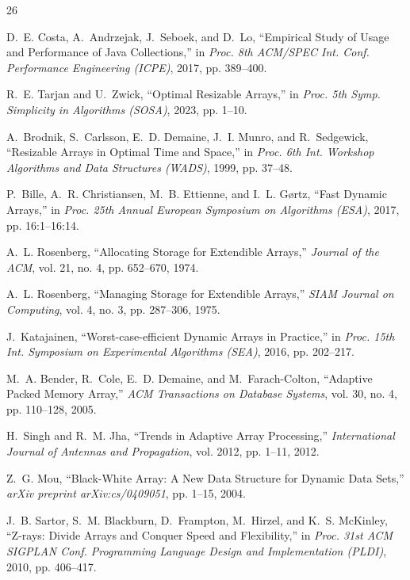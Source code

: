 \begin{thebibliography}{26}

D.~E. Costa, A.~Andrzejak, J.~Seboek, and D.~Lo, ``Empirical Study of Usage and Performance of Java Collections,'' in \emph{Proc. 8th ACM/SPEC Int. Conf. Performance Engineering (ICPE)}, 2017, pp. 389--400.

R.~E. Tarjan and U.~Zwick, ``Optimal Resizable Arrays,'' in \emph{Proc. 5th Symp. Simplicity in Algorithms (SOSA)}, 2023, pp. 1--10.

A.~Brodnik, S.~Carlsson, E.~D. Demaine, J.~I. Munro, and R.~Sedgewick, ``Resizable Arrays in Optimal Time and Space,'' in \emph{Proc. 6th Int. Workshop Algorithms and Data Structures (WADS)}, 1999, pp. 37--48.

P.~Bille, A.~R. Christiansen, M.~B. Ettienne, and I.~L. G{\o}rtz, ``Fast Dynamic Arrays,'' in \emph{Proc. 25th Annual European Symposium on Algorithms (ESA)}, 2017, pp. 16:1--16:14.

A.~L. Rosenberg, ``Allocating Storage for Extendible Arrays,'' \emph{Journal of the ACM}, vol. 21, no. 4, pp. 652--670, 1974.

A.~L. Rosenberg, ``Managing Storage for Extendible Arrays,'' \emph{SIAM Journal on Computing}, vol. 4, no. 3, pp. 287--306, 1975.

J.~Katajainen, ``Worst-case-efficient Dynamic Arrays in Practice,'' in \emph{Proc. 15th Int. Symposium on Experimental Algorithms (SEA)}, 2016, pp. 202--217.

M.~A. Bender, R.~Cole, E.~D. Demaine, and M.~Farach-Colton, ``Adaptive Packed Memory Array,'' \emph{ACM Transactions on Database Systems}, vol. 30, no. 4, pp. 110--128, 2005.

H.~Singh and R.~M. Jha, ``Trends in Adaptive Array Processing,'' \emph{International Journal of Antennas and Propagation}, vol. 2012, pp. 1--11, 2012.

Z.~G. Mou, ``Black-White Array: A New Data Structure for Dynamic Data Sets,'' \emph{arXiv preprint arXiv:cs/0409051}, pp. 1--15, 2004.

J.~B. Sartor, S.~M. Blackburn, D.~Frampton, M.~Hirzel, and K.~S. McKinley, ``Z-rays: Divide Arrays and Conquer Speed and Flexibility,'' in \emph{Proc. 31st ACM SIGPLAN Conf. Programming Language Design and Implementation (PLDI)}, 2010, pp. 406--417.


\end{thebibliography}
